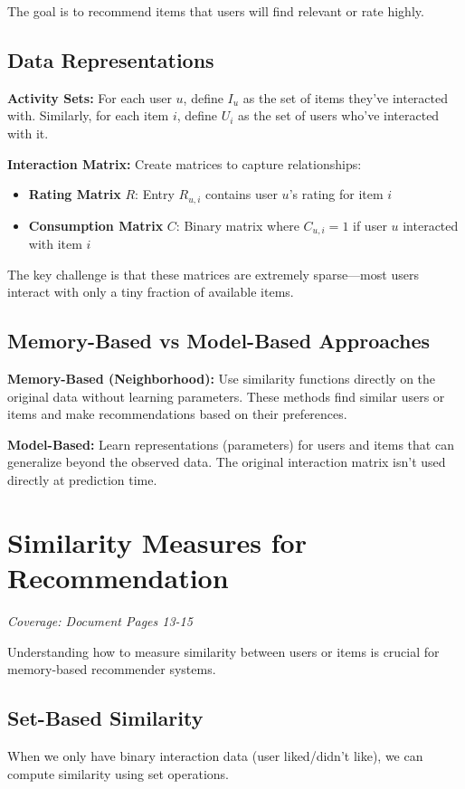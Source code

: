 \documentclass[11pt,a4paper]{article}
\begin{document}
The goal is to recommend items that users will find relevant or rate highly.

\subsection{Data Representations}

\textbf{Activity Sets:} For each user $u$, define $I_u$ as the set of items they've interacted with. Similarly, for each item $i$, define $U_i$ as the set of users who've interacted with it.

\textbf{Interaction Matrix:} Create matrices to capture relationships:
\begin{itemize}
\item \textbf{Rating Matrix } $R$: Entry $R_{u,i}$ contains user $u$'s rating for item $i$
\item \textbf{Consumption Matrix } $C$: Binary matrix where $C_{u,i} = 1$ if user $u$ interacted with item $i$
\end{itemize}

The key challenge is that these matrices are extremely sparse—most users interact with only a tiny fraction of available items.

\subsection{Memory-Based vs Model-Based Approaches}

\textbf{Memory-Based (Neighborhood):} Use similarity functions directly on the original data without learning parameters. These methods find similar users or items and make recommendations based on their preferences.

\textbf{Model-Based:} Learn representations (parameters) for users and items that can generalize beyond the observed data. The original interaction matrix isn't used directly at prediction time.

\section{Similarity Measures for Recommendation}
\textit{Coverage: Document Pages 13-15}

Understanding how to measure similarity between users or items is crucial for memory-based recommender systems.

\subsection{Set-Based Similarity}
When we only have binary interaction data (user liked/didn't like), we can compute similarity using set operations.
\end{document}
